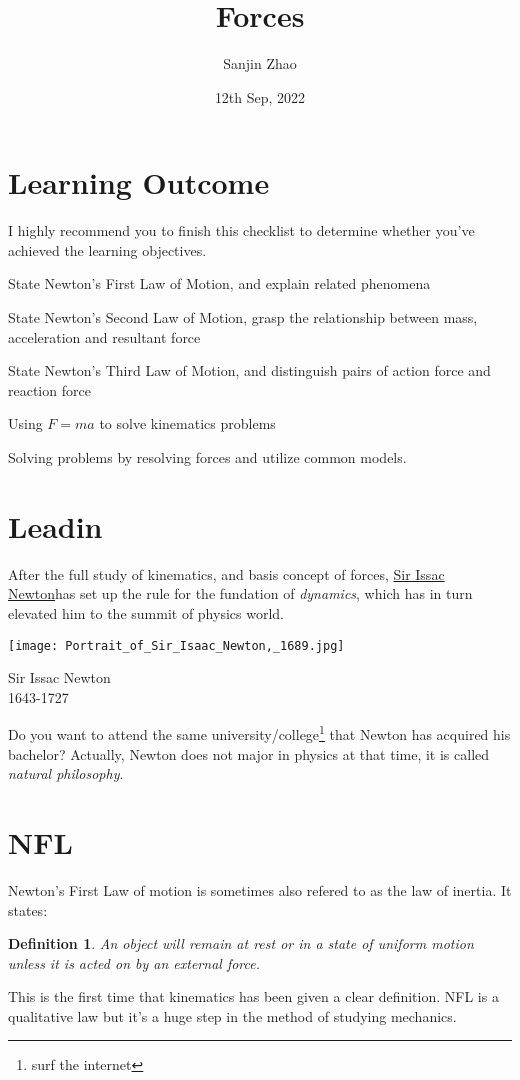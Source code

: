 \documentclass[a4paper]{tufte-handout}
\title{Forces}
\author{Sanjin Zhao}
\date{12th Sep, 2022}  %
\newtheorem{definition}[theorem]{Definition}%
\begin{document}
\maketitle%
\section*{Learning Outcome}
I highly recommend you to finish this checklist to determine whether you've achieved the learning objectives.
\begin{todolist}
  \item State Newton's First Law of Motion, and explain related phenomena
  \item State Newton's Second Law of Motion, grasp the relationship between mass, acceleration and resultant force
  \item State Newton's Third Law of Motion, and distinguish pairs of action force and reaction force
  \item Using $F=ma$ to solve kinematics problems
  \item Solving problems by resolving forces and utilize common models.
\end{todolist}
\clearpage

\section{Leadin}
After the full study of kinematics, and basis concept of forces, \href{https://en.wikipedia.org/wiki/Isaac_Newton}{Sir Issac Newton}has set up the rule for the fundation of \emph{dynamics}, which has in turn elevated him to the summit of physics world.
\begin{marginfigure}
\centering
\texttt{[image: Portrait\_of\_Sir\_Isaac\_Newton,\_1689.jpg]}
\caption{Sir Issac Newton\\1643-1727}
\end{marginfigure}
Do you want to attend the same university/college\footnote{surf the internet} that Newton has acquired his bachelor? Actually, Newton does not major in physics at that time, it is called \emph{natural philosophy}.

\section{NFL}
Newton's First Law of motion is sometimes also refered to as the law of inertia. It states:
\begin{definition}
An object will remain at rest or in a state of uniform motion unless it is acted on by an external force.
\end{definition}
This is the first time that kinematics has been given a clear definition. NFL is a qualitative law but it's a huge step in the method of studying mechanics.
\end{document}
